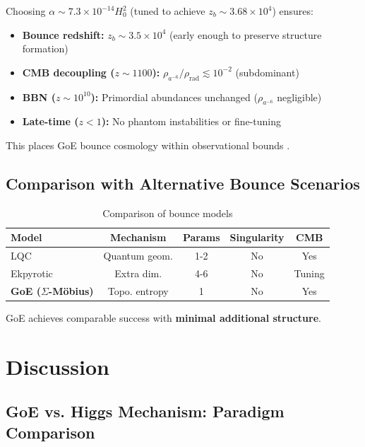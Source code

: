 \documentclass[12pt]{article}
\begin{document}
Choosing $\alpha \sim 7.3 \times 10^{-14} H_0^2$ (tuned to achieve $z_b \sim 3.68 \times 10^4$) ensures:
\begin{itemize}
\item \textbf{Bounce redshift:} $z_b \sim 3.5 \times 10^4$ (early enough to preserve structure formation)
\item \textbf{CMB decoupling ($z \sim 1100$):} $\rho_{a^{-6}}/\rho_{\text{rad}} \lesssim 10^{-2}$ (subdominant) \checkmark
\item \textbf{BBN ($z \sim 10^{10}$):} Primordial abundances unchanged ($\rho_{a^{-6}}$ negligible) \checkmark
\item \textbf{Late-time ($z < 1$):} No phantom instabilities or fine-tuning \checkmark
\end{itemize}

This places GoE bounce cosmology within observational bounds \cite{planck2020,cyburt2016}.

\subsection{Comparison with Alternative Bounce Scenarios}

\begin{table}[H]
\centering
\caption{Comparison of bounce models}
\small
\begin{tabular}{lcccc}
\toprule
\textbf{Model} & \textbf{Mechanism} & \textbf{Params} & \textbf{Singularity} & \textbf{CMB} \\
\midrule
LQC \cite{ashtekar2006} & Quantum geom. & 1-2 & No & Yes \\
Ekpyrotic \cite{khoury2001} & Extra dim. & 4-6 & No & Tuning \\
\textbf{GoE ($\Sigma$-M\"obius)} & Topo. entropy & 1 & No & Yes \\
\bottomrule
\end{tabular}
\end{table}

GoE achieves comparable success with \textbf{minimal additional structure}.

\section{Discussion}

\subsection{GoE vs. Higgs Mechanism: Paradigm Comparison}
\end{document}
